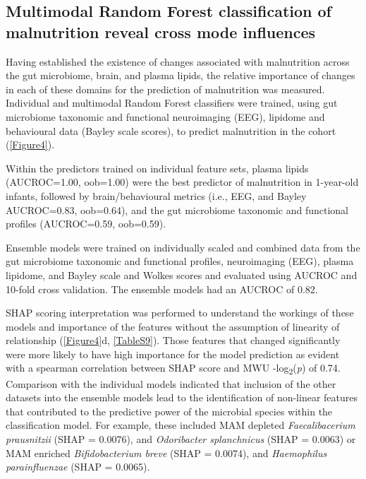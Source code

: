 \documentclass{article}
\begin{document}
\subsection*{Multimodal Random Forest classification of malnutrition reveal cross mode influences}
Having established the existence of changes associated with malnutrition across the gut microbiome, brain, and plasma lipids, the relative importance of changes in each of these domains for the prediction of malnutrition was measured.
Individual and multimodal Random Forest classifiers were trained, using gut microbiome taxonomic and functional neuroimaging (EEG), lipidome and behavioural data (Bayley scale scores), to predict malnutrition in the cohort (\autoref{Figure4}).

Within the predictors trained on individual feature sets, plasma lipids (AUCROC=1.00, oob=1.00) were the best predictor of malnutrition in 1-year-old infants, followed by brain/behavioural metrics (i.e., EEG, and Bayley AUCROC=0.83, oob=0.64), and the gut microbiome taxonomic and functional profiles (AUCROC=0.59, oob=0.59).

Ensemble models were trained on individually scaled and combined data from the gut microbiome taxonomic and functional profiles, neuroimaging (EEG), plasma lipidome, and Bayley scale and Wolkes scores and evaluated using AUCROC and 10-fold cross validation.
The ensemble models had an AUCROC of 0.82.

\gls{SHAP} scoring interpretation was performed to understand the workings of these models and importance of the features without the assumption of linearity of relationship (\autoref{Figure4}d, \autoref{TableS9}).
Those features that changed significantly were more likely to have high importance for the model prediction as evident with a spearman correlation between SHAP score and \gls{MWU} -log\textsubscript{2}(\textit{p}) of 0.74.
Comparison with the individual models indicated that inclusion of the other datasets into the ensemble models lead to the identification of non-linear features that contributed to the predictive power of the microbial species within the classification model.
For example, these included \gls{MAM} depleted \textit{Faecalibacerium prausnitzii} (SHAP = 0.0076), and \textit{Odoribacter splanchnicus} (SHAP = 0.0063) or \gls{MAM} enriched \textit{Bifidobacterium breve} (SHAP = 0.0074), and \textit{Haemophilus parainfluenzae} (SHAP = 0.0065).
\end{document}
